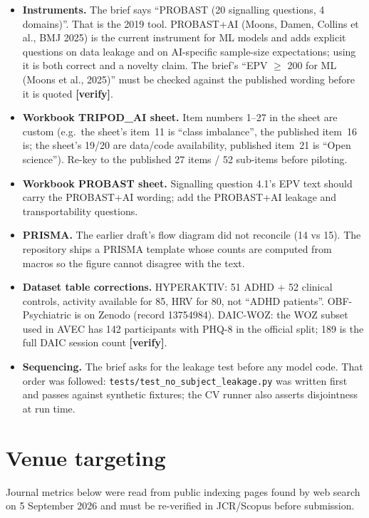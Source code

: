 \documentclass[11pt,a4paper]{article}
\newcommand{\verify}{\textcolor{accent}{\textbf{[verify]}}}
\begin{document}
\begin{itemize}
\item \textbf{Instruments.} The brief says ``PROBAST (20 signalling questions, 4 domains)''. That is
the 2019 tool. PROBAST+AI (Moons, Damen, Collins et al., BMJ 2025) is the current instrument for
ML models and adds explicit questions on data leakage and on AI-specific sample-size expectations;
using it is both correct and a novelty claim. The brief's ``EPV $\geq$ 200 for ML (Moons et al.,
2025)'' must be checked against the published wording before it is quoted \verify.
\item \textbf{Workbook TRIPOD\_AI sheet.} Item numbers 1--27 in the sheet are custom (e.g.\ the sheet's
item~11 is ``class imbalance'', the published item~16 is; the sheet's 19/20 are data/code
availability, published item~21 is ``Open science''). Re-key to the published 27 items / 52
sub-items before piloting.
\item \textbf{Workbook PROBAST sheet.} Signalling question 4.1's EPV text should carry the PROBAST+AI
wording; add the PROBAST+AI leakage and transportability questions.
\item \textbf{PRISMA.} The earlier draft's flow diagram did not reconcile (14 vs 15). The
repository ships a PRISMA template whose counts are computed from macros so the figure cannot
disagree with the text.
\item \textbf{Dataset table corrections.} HYPERAKTIV: 51 ADHD + 52 clinical controls, activity
available for 85, HRV for 80, not ``ADHD patients''. OBF-Psychiatric is on Zenodo
(record 13754984). DAIC-WOZ: the WOZ subset used in AVEC has 142 participants with PHQ-8 in the
official split; 189 is the full DAIC session count \verify.
\item \textbf{Sequencing.} The brief asks for the leakage test before any model code. That order
was followed: \texttt{tests/test\_no\_subject\_leakage.py} was written first and passes against
synthetic fixtures; the CV runner also asserts disjointness at run time.
\end{itemize}

\section{Venue targeting}
Journal metrics below were read from public indexing pages found by web search on 5 September 2026
and must be re-verified in JCR/Scopus before submission.
\end{document}
